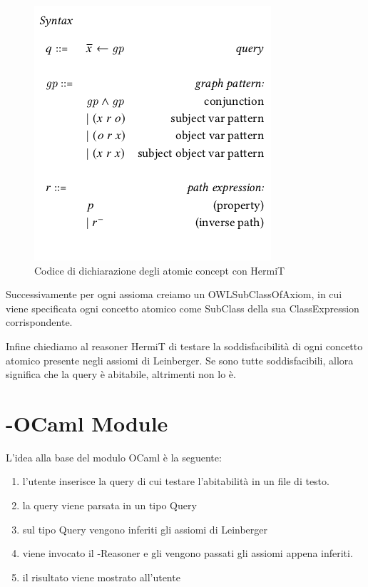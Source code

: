         \begin{figure}
            \centering
            \includegraphics[width=\textwidth]{pictures/leinbergSyntax.png}
            \caption{Codice di dichiarazione degli atomic concept con HermiT}
            \label{fig:declarationCode}
        \end{figure}
                
        Successivamente per ogni assioma creiamo un OWLSubClassOfAxiom, in cui viene specificata ogni concetto atomico come SubClass della sua ClassExpression corrispondente. 

        Infine chiediamo al reasoner HermiT di testare la soddisfacibilità di ogni concetto atomico presente negli assiomi di Leinberger. Se sono tutte soddisfacibili, allora significa che la query è abitabile, altrimenti non lo è.

        \section{-OCaml Module}
        L'idea alla base del modulo OCaml è la seguente: 
            \begin{enumerate}
                \item l'utente inserisce la query di cui testare l'abitabilità in un file di testo. 
                \item la query viene parsata in un tipo Query
                \item sul tipo Query vengono inferiti gli assiomi di Leinberger
                \item viene invocato il -Reasoner e gli vengono passati gli assiomi appena inferiti.
                \item il risultato viene mostrato all'utente
            \end{enumerate}


